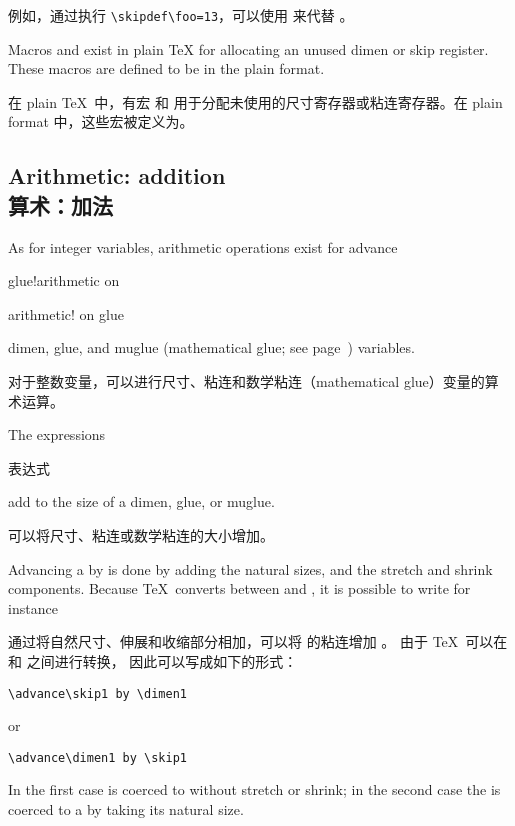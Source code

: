 例如，通过执行 \verb-\skipdef\foo=13-，可以使用  来代替 。

Macros  and  exist in plain \TeX
for allocating an unused dimen or skip register.
These macros are defined to be  in the plain format.

在 plain \TeX\ 中，有宏  和  用于分配未使用的尺寸寄存器或粘连寄存器。在 plain format 中，这些宏被定义为。


\subsection{Arithmetic: addition\\算术：加法}

As for integer variables, arithmetic operations exist for
\cstoidx advance\par\term  glue!arithmetic on\par\term arithmetic! on glue\par
dimen, glue, and muglue (mathematical glue; see page~\pageref{muglue})
variables.

对于整数变量，可以进行尺寸、粘连和数学粘连（mathematical glue）变量的算术运算。

The expressions

表达式
\begin{Disp}%
     \nl
     \nl
     \end{Disp}
add to the size of a dimen, glue, or muglue.

可以将尺寸、粘连或数学粘连的大小增加。


Advancing a  by  is done by
adding the natural sizes, and the stretch and shrink components.
Because \TeX\ converts between  and ,
it is possible to write for instance

通过将自然尺寸、伸展和收缩部分相加，可以将  的粘连增加 。
由于 \TeX\ 可以在  和  之间进行转换，
因此可以写成如下的形式：
\begin{verbatim}
\advance\skip1 by \dimen1
\end{verbatim}
or
\begin{verbatim}
\advance\dimen1 by \skip1
\end{verbatim}
In the first case   is coerced to  without
stretch or shrink; in the second case the  is coerced
to a  by taking its natural size.

